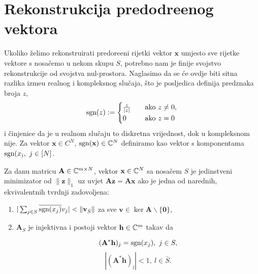 \documentclass[a4paper,twoside,12pt]{memoir} %
\newcommand{\vect}[1]{\mathbf{#1}}
\renewcommand{\vec}{\vect}
\newcommand{\norm}[1]{\|{#1}\|}
\newcommand{\sgn}{\text{\normalfont{sgn}}}
\begin{document}
\section[Rekonstrukcija predodre\dj enog vektora][Rekonstrukcija predodre\dj enog vektora]{Rekonstrukcija predodre\dj enog vektora}
Ukoliko \v{z}elimo rekonstruirati predore\dj eni rijetki vektor $\vec x$ umjesto sve rijetke vektore s nosa\v{c}emo u nekom skupu $S$, potrebno nam je finije svojstvo rekonstrukcije od svojstva nul-prostora. Naglasimo da se \'ce ovdje biti sitna razlika izme\dj u realnog i kompleksnog slu\v{c}aja, \v{s}to je posljedica definija predznaka broja $z$,
\begin{equation*}
    \sgn(z):= 
    \begin{cases}
        \frac{z}{|z|} \quad &\text{ako } z \neq 0,\\
        0 &\text{ako } z = 0
    \end{cases}
\end{equation*}
i \v{c}injenice da je u realnom slu\v{c}aju to diskretna vrijednost, dok u kompleksnom nije. Za vektor $\vec x \in C^N$, $\sgn(\vec x)\in \C^N$ definiramo kao vektor s komponentama $\sgn(x_),\ j \in [N]$.
\begin{thm}
    Za danu matricu $\vec A \in \C^{m \times N}$, vektor $\vec x \in \C^N$ sa nosa\v{c}em $S$ je jedinstveni minimizator od $\norm{\vec z}_1$ uz uvjet $\vec{Az} = \vec{Ax}$ ako je jedna od narednih, ekvivalentnih tvrdnji zadovoljena:
    \begin{enumerate}[label=(\alph*)]
        \item $|\sum_{j \in S} \overline{\sgn(x_j)}v_j| < \norm{\vec v_{\bar S}}$ za sve $\vec v \in \ker \vec A \backslash \{ \vec 0 \}$, 
            \newpage
        \item $\vec A_S$ je injektivna i postoji vektor $\vec h \in \C^m$ takav da
            \begin{multicols}{2}
                \noindent
                \begin{equation*}
                    (\vec A^* \vec h)_j = \sgn(x_j),\ j \in S,
                \end{equation*}
                \begin{equation*}
                    |(\vec A^* \vec h)_l| < 1,\ l \in \bar S.
                \end{equation*}
            \end{multicols}
    \end{enumerate}
\end{thm}
\end{document}
